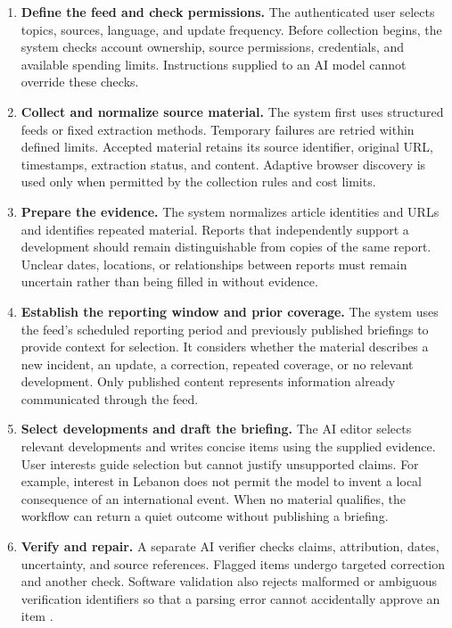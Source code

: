 \begin{enumerate}
    \item \textbf{Define the feed and check permissions.}
    The authenticated user selects topics, sources, language, and update frequency. Before collection begins, the system checks account ownership, source permissions, credentials, and available spending limits. Instructions supplied to an AI model cannot override these checks.

    \item \textbf{Collect and normalize source material.}
    The system first uses structured feeds or fixed extraction methods. Temporary failures are retried within defined limits. Accepted material retains its source identifier, original URL, timestamps, extraction status, and content. Adaptive browser discovery is used only when permitted by the collection rules and cost limits.

    \item \textbf{Prepare the evidence.}
    The system normalizes article identities and URLs and identifies repeated material. Reports that independently support a development should remain distinguishable from copies of the same report. Unclear dates, locations, or relationships between reports must remain uncertain rather than being filled in without evidence.

    \item \textbf{Establish the reporting window and prior coverage.}
    The system uses the feed's scheduled reporting period and previously published briefings to provide context for selection. It considers whether the material describes a new incident, an update, a correction, repeated coverage, or no relevant development. Only published content represents information already communicated through the feed.

    \item \textbf{Select developments and draft the briefing.}
    The AI editor selects relevant developments and writes concise items using the supplied evidence. User interests guide selection but cannot justify unsupported claims. For example, interest in Lebanon does not permit the model to invent a local consequence of an international event. When no material qualifies, the workflow can return a quiet outcome without publishing a briefing.

    \item \textbf{Verify and repair.}
    A separate AI verifier checks claims, attribution, dates, uncertainty, and source references. Flagged items undergo targeted correction and another check. Software validation also rejects malformed or ambiguous verification identifiers so that a parsing error cannot accidentally approve an item \cite{controlledreliability}.


\end{enumerate}
